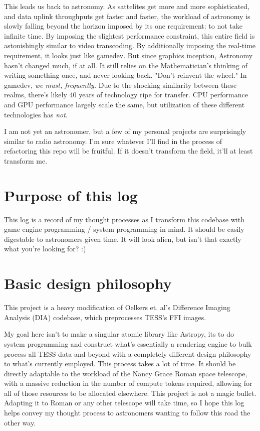 \documentclass[%
 reprint,
 amsmath,amssymb,
 aps,
showkeys,
]{revtex4-2}
\begin{document}
This leads us back to astronomy. As sattelites get more and more sophisticated, and data uplink throughputs get faster and faster, the workload of astronomy is slowly falling beyond the horizon imposed by its one requirement: to not take infinite time. By imposing the slightest performance constraint, this entire field is astonishingly similar to video transcoding. By additionally imposing the real-time requirement, it looks just like gamedev. But since graphics inception, Astronomy hasn't changed much, if at all. It still relies on the Mathematician's thinking of writing something once, and never looking back. "Don't reinvent the wheel." In gamedev, \textit{we must, frequently.} Due to the shocking similarity between these realms, there's likely 40 years of technology ripe for transfer. CPU performance and GPU performance largely scale the same, but utilization of these different technologies has \textit{not}.

I am not yet an astronomer, but a few of my personal projects are surprisingly similar to radio astronomy. I'm sure whatever I'll find in the process of refactoring this repo will be fruitful. If it doesn't transform the field, it'll at least transform me. 

\section{Purpose of this log}

This log is a record of my thought processes as I transform this codebase with game engine programming / system programming in mind. It should be easily digestable to astronomers given time. It will look alien, but isn't that exactly what you're looking for? :)

\section{Basic design philosophy}

This project is a heavy modification of Oelkers et. al's Difference Imaging Analysis (DIA) codebase, which preprocesses TESS's FFI images.

My goal here isn't to make a singular atomic library like Astropy, its to do system programming and construct what's essentially a rendering engine to bulk process all TESS data and beyond with a completely different design philosophy to what's currently employed. This process takes a lot of time. It should be directly adaptable to the workload of the Nancy Grace Roman space telescope, with a massive reduction in the number of compute tokens required, allowing for all of those resources to be allocated elsewhere. This project is not a magic bullet. Adapting it to Roman or any other telescope will take time, so I hope this log helps convey my thought process to astronomers wanting to follow this road the other way.
\end{document}
